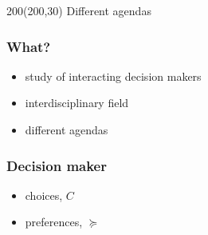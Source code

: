 {
  \begin{frame}
    \begin{textblock}{200}(200,30)
      Different agendas
    \end{textblock}
  \end{frame}
}


{
  \begin{frame}

    \frametitle{\textbf{What?}}
    \begin{itemize}
    \pause \item study of interacting decision makers
    \pause \item interdisciplinary field
    \pause \item different agendas
    \end{itemize}
  \end{frame}
}



\begin{frame}
  \frametitle{Decision maker}
  \begin{itemize}
  \item<2-> choices, $C$
  \item<3-> preferences, $\succeq$ \\
  \end{itemize}
\end{frame}

